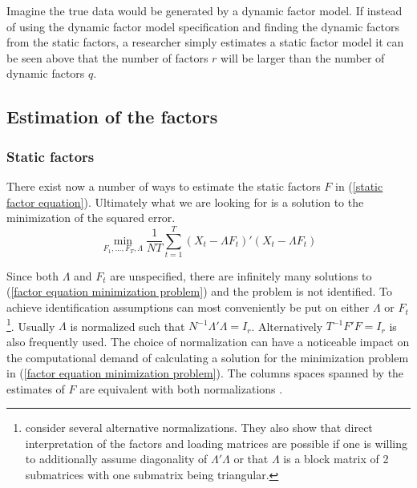 \documentclass[11pt]{article}
\begin{document}
Imagine the true data would be generated by a dynamic factor model. If instead of using the dynamic factor model specification and finding the dynamic factors from the static factors, a researcher simply estimates a static factor model it can be seen above that the number of factors $r$ will be larger than the number of dynamic factors $q$.

\subsection{Estimation of the factors}
\subsubsection{Static factors}
There exist now a number of ways to estimate the static factors $F$ in (\ref{static factor equation}). Ultimately what we are looking for is a solution to the minimization of the squared error.
\begin{equation}
	\label{factor equation minimization problem}
	\min_{F_1, ..., F_T, \Lambda} \frac{1}{NT} \sum_{t=1}^T (X_t - \Lambda F_t)'(X_t - \Lambda F_t)
\end{equation}

Since both $\Lambda$ and $F_t$ are unspecified, there are infinitely many solutions to (\ref{factor equation minimization problem}) and the problem is not identified. To achieve identification assumptions can most conveniently be put on either $\Lambda$ or $F_t$\footnote{\citet{bai2013principal} consider several alternative normalizations. They also show that direct interpretation of the factors and loading matrices are possible if one is willing to additionally assume diagonality of $\Lambda'\Lambda$ or that $\Lambda$ is a block matrix of 2 submatrices with one submatrix being triangular.}. Usually $\Lambda$ is normalized such that $N^{-1} \Lambda'\Lambda = I_r$. Alternatively $T^{-1}F'F = I_r$ is also frequently used. The choice of normalization can have a noticeable impact on the computational demand of calculating a solution for the minimization problem in (\ref{factor equation minimization problem}). The columns spaces spanned by the estimates of $F$ are equivalent with both normalizations \citep{stock2011dynamic}.
\end{document}
